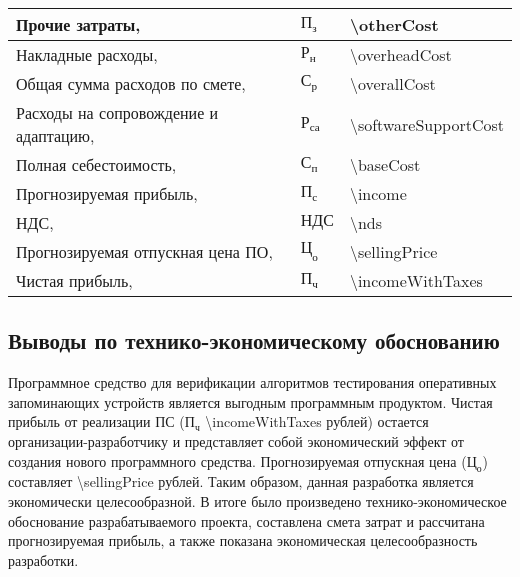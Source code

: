 \begin{table}[!ht]
\begin{tabular}{| >{\raggedright}m{}
                  | >{\centering}m{}
                  | >{\centering\arraybackslash}m{}|}
    \hline
    Прочие затраты, \byr{} & $ \text{П}_\text{з} $ & \num{\otherCost} \\

    \hline
    Накладные расходы, \byr{} & $ \text{Р}_\text{н} $ & \num{\overheadCost} \\

    \hline
    Общая сумма расходов по смете, \byr{} & $ \text{С}_\text{р} $ & \num{\overallCost} \\

    \hline
    Расходы на сопровождение и адаптацию, \byr{} & $ \text{Р}_\text{са} $ & \num{\softwareSupportCost} \\

    \hline
    Полная себестоимость, \byr{} & $ \text{С}_\text{п} $ & \num{\baseCost} \\

    \hline
    Прогнозируемая прибыль, \byr{} & $ \text{П}_\text{с} $ & \num{\income} \\

    \hline
    НДС, \byr{} & $ \text{НДС} $ & \num{\nds} \\

    \hline
    Прогнозируемая отпускная цена ПО, \byr{} & $ \text{Ц}_\text{о} $ & \num{\sellingPrice} \\

    \hline
    Чистая прибыль, \byr{} & $ \text{П}_\text{ч} $ & \num{\incomeWithTaxes} \\

    \hline
  \end{tabular}
\end{table}

\subsection{Выводы по технико-экономическому обоснованию}

Программное средство для верификации алгоритмов тестирования оперативных запоминающих устройств является выгодным программным продуктом.
Чистая прибыль от реализации ПС ($ \text{П}_\text{ч} $ \num{\incomeWithTaxes} рублей) остается организации-разработчику и представляет собой экономический эффект от создания нового программного средства.
Прогнозируемая отпускная цена ($\text{Ц}_\text{о}$) составляет \num{\sellingPrice} рублей. Таким образом, данная разработка является экономически целесообразной.
В итоге было произведено технико-экономическое обоснование разрабатываемого проекта, составлена смета затрат и рассчитана прогнозируемая прибыль, а также показана экономическая целесообразность разработки.

\hfill
\clearpage
